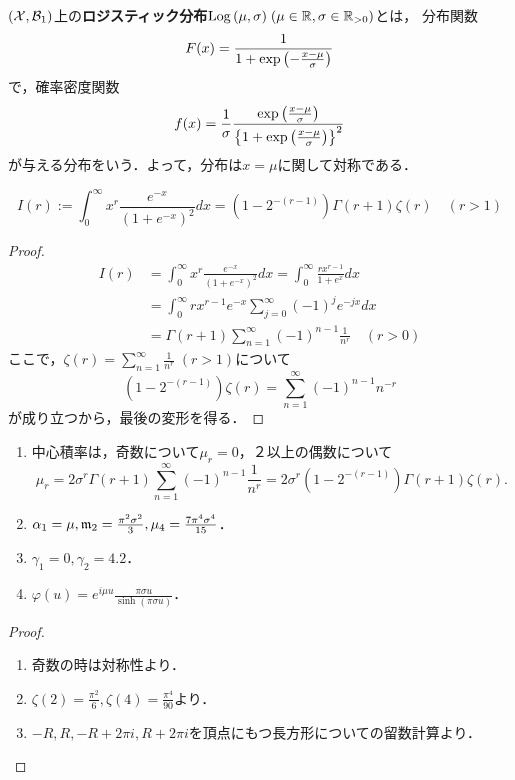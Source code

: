 \documentclass[uplatex,dvipdfmx]{jsreport}
\begin{document}
\begin{definition}
    $(\mathcal{X},\mathcal{B}_1)$上の\textbf{ロジスティック分布}$\mathrm{Log}\,(\mu,\sigma)\;(\mu\in\mathbb{R},\sigma\in\mathbb{R}_{>0})$とは，
    分布関数
    \[F(x)=\frac{1}{1+\exp\left(-\frac{x-\mu}{\sigma}\right)}\]
    で，確率密度関数
    \[f(x)=\frac{1}{\sigma}\frac{\exp\left(\frac{x-\mu}{\sigma}\right)}{\left\{1+\exp\left(\frac{x-\mu}{\sigma}\right)\right\}^2}\]
    が与える分布をいう．よって，分布は$x=\mu$に関して対称である．
\end{definition}

\begin{lemma}
    \[I(r):=\int^\infty_0x^r\frac{e^{-x}}{(1+e^{-x})^2}dx=(1-2^{-(r-1)})\Gamma(r+1)\zeta(r)\quad(r>1)\]
\end{lemma}
\begin{proof}
    \begin{align*}
        I(r)&=\int^\infty_0x^r\frac{e^{-x}}{(1+e^{-x})^2}dx=\int^\infty_0\frac{rx^{r-1}}{1+e^x}dx\\
        &=\int^\infty_0rx^{r-1}e^{-x}\sum^\infty_{j=0}(-1)^je^{-jx}dx\\
        &=\Gamma(r+1)\sum^\infty_{n=1}(-1)^{n-1}\frac{1}{n^r}\quad(r>0)
    \end{align*}
    ここで，$\zeta(r)=\sum^\infty_{n=1}\frac{1}{n^r}\;(r>1)$について
    \[(1-2^{-(r-1)})\zeta(r)=\sum^\infty_{n=1}(-1)^{n-1}n^{-r}\]
    が成り立つから，最後の変形を得る．
\end{proof}

\begin{proposition}\mbox{}
    \begin{enumerate}
        \item 中心積率は，奇数について$\mu_r=0$，２以上の偶数について
        \[\mu_r=2\sigma^r\Gamma(r+1)\sum^\infty_{n=1}(-1)^{n-1}\frac{1}{n^r}=2\sigma^r(1-2^{-(r-1)})\Gamma(r+1)\zeta(r).\]
        \item $\alpha_1=\mu,\mathfrak{m}_2=\frac{\pi^2\sigma^2}{3},\mu_4=\frac{7\pi^4\sigma^4}{15}$．
        \item $\gamma_1=0,\gamma_2=4.2$．
        \item $\varphi(u)=e^{i\mu u}\frac{\pi\sigma u}{\sinh(\pi\sigma u)}$．
    \end{enumerate}
\end{proposition}
\begin{proof}\mbox{}
    \begin{enumerate}
        \item 奇数の時は対称性より．
        \item $\zeta(2)=\frac{\pi^2}{6},\zeta(4)=\frac{\pi^4}{90}$より．
        \item $-R,R,-R+2\pi i,R+2\pi i$を頂点にもつ長方形についての留数計算より．
    \end{enumerate}
\end{proof}
\end{document}
